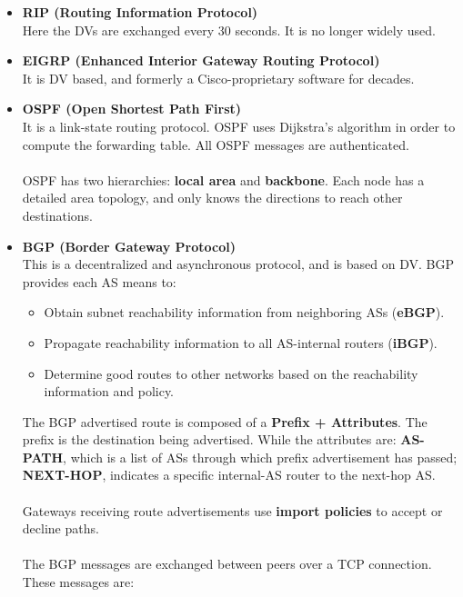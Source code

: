 \documentclass{article}
\begin{document}
\begin{itemize}
	\item \textbf{RIP (Routing Information Protocol)}
	\vspace{.2cm} \\
	Here the DVs are exchanged every 30 seconds. It is no longer widely used.
	
	\item \textbf{EIGRP (Enhanced Interior Gateway Routing Protocol)}
	\vspace{.2cm} \\
	It is DV based, and formerly a Cisco-proprietary software for decades.
	
	\item \textbf{OSPF (Open Shortest Path First)}
	\vspace{.2cm} \\
	It is a link-state routing protocol. OSPF uses Dijkstra's algorithm in order to compute the forwarding table. All OSPF messages are authenticated. \\ \\
	OSPF has two hierarchies: \textbf{local area} and \textbf{backbone}. Each node has a detailed area topology, and only knows the directions to reach other destinations.
	
	\item \textbf{BGP (Border Gateway Protocol)}
	\vspace{.2cm} \\
	This is a decentralized and asynchronous protocol, and is based on DV. BGP provides each AS means to:
	
	\begin{itemize}
		\item Obtain subnet reachability information from neighboring ASs (\textbf{eBGP}).
		\item Propagate reachability information to all AS-internal routers (\textbf{iBGP}).
		\item Determine good routes to other networks based on the reachability information and policy.
	\end{itemize}
	The BGP advertised route is composed of a \textbf{Prefix + Attributes}. The prefix is the destination being advertised. While the attributes are: \textbf{AS-PATH}, which is a list of ASs through which prefix advertisement has passed; \textbf{NEXT-HOP}, indicates a specific internal-AS router to the next-hop AS. \\ \\
	Gateways receiving route advertisements use \textbf{import policies} to accept or decline paths. \\ \\
	The BGP messages are exchanged between peers over a TCP connection. These messages are:
	

\end{itemize}
\end{document}
